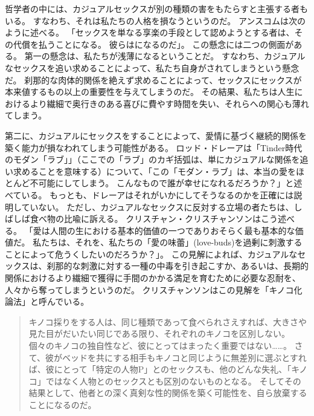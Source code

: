 \documentclass[paper=a4,book,openany]{jlreq} \usepackage{mystyle}
\begin{document}
哲学者の中には、カジュアルセックスが別の種類の害をもたらすと主張する者もいる。
すなわち、それは私たちの人格を損なうというのだ。
アンスコムは次のように述べる。
「セックスを単なる享楽の手段として認めようとする者は、その代償を払うことになる。
彼らはになるのだ」\citep{anscombe72contraception}。
この懸念には二つの側面がある。
第一の懸念は、私たちが浅薄になるということだ。
すなわち、カジュアルなセックスを追い求めることによって、私たち自身がされてしまうという懸念だ。
刹那的な肉体的関係を絶えず求めることによって、セックスにセックスが本来値するもの以上の重要性を与えてしまうのだ。
その結果、私たちは人生におけるより繊細で奥行きのある喜びに費やす時間を失い、それらへの関心も薄れてしまう。

第二に、カジュアルにセックスをすることによって、愛情に基づく継続的関係を築く能力が損なわれてしまう可能性がある。
ロッド・ドレーアは「Tinder時代のモダン「ラブ」」（ここでの「ラブ」のカギ括弧は、単にカジュアルな関係を追い求めることを意味する）について、「この「モダン・ラブ」は、本当の愛をほとんど不可能にしてしまう。
こんなもので誰が幸せになれるだろうか？」と述べている\citep{dreher15:_moder_love_age_tind}。
もっとも、ドレーアはそれがいかにしてそうなるのかを正確には説明していない。
ただし、カジュアルなセックスに反対する立場の者たちは、しばしば食べ物の比喩に訴える。
クリスチャン・クリスチャンソンはこう述べる。
「愛は人間の生における基本的価値の一つであり{\DDASH}おそらく最も基本的な価値だ。
私たちは、それを、私たちの「愛の味蕾」(love-buds)を過剰に刺激することによって危うくしたいのだろうか？」\citep[p. 105]{krisjansson98:_casual_sex_revis}。
この見解によれば、カジュアルなセックスは、刹那的な刺激に対する一種の中毒を引き起こすか、あるいは、長期的関係におけるより繊細で獲得に手間のかかる満足を育むために必要な忍耐を、人々から奪ってしまうというのだ。
クリスチャンソンはこの見解を「キノコ化論法」と呼んでいる。

\begin{quote}
  キノコ採りをする人は、同じ種類であって食べられさえすれば、大きさや見た目がだいたい同じである限り、それぞれのキノコを区別しない。
個々のキノコの独自性など、彼にとってはまったく重要ではない……。
さて、彼がベッドを共にする相手もキノコと同じように無差別に選ぶとすれば、彼にとって「特定の人物P」とのセックスも、他のどんな{\DDASH}失礼、「キノコ」ではなく{\DDASH}人物とのセックスとも区別のないものとなる。
そしてその結果として、他者との深く真剣な性的関係を築く可能性を、自ら放棄することになるのだ。
\citep[p. 101]{krisjansson98:_casual_sex_revis}
\end{quote}
\end{document}
